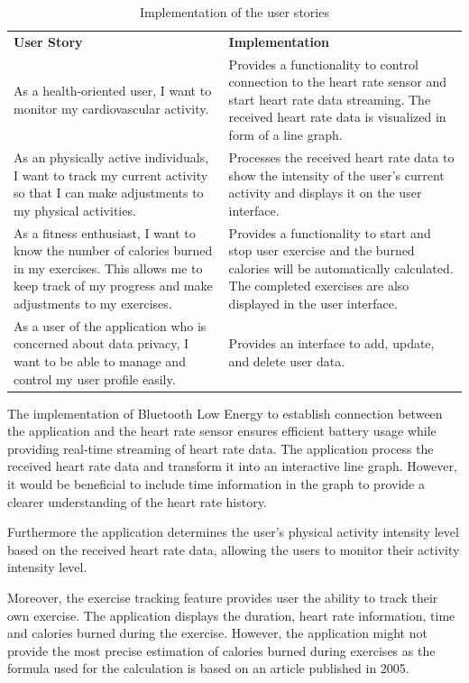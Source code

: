 \begin{longtable}{p{} p{}}
    \label{tab:user_story_and_assessment}\\

    \caption{Implementation of the user stories}\\
        \hline
        \textbf{User Story} & \textbf{Implementation} \\
        \hline
        As a health-oriented user, I want to monitor my cardiovascular activity. & Provides a functionality to control connection to the heart rate sensor and start heart rate data streaming. The received heart rate data is visualized in form of a line graph.\\
        \hline
        As an physically active individuals, I want to track my current activity so that I can make adjustments to my physical activities. & Processes the received heart rate data to show the intensity of the user's current activity and displays it on the user interface.\\    
        \hline
        As a fitness enthusiast, I want to know the number of calories burned in my exercises. This allows me to keep track of my progress and make adjustments to my exercises. & Provides a functionality to start and stop user exercise and the burned calories will be automatically calculated. The completed exercises are also displayed in the user interface.\\
        \hline
        As a user of the application who is concerned about data privacy, I want to be able to manage and control my user profile easily. & Provides an interface to add, update, and delete user data.\\
        \hline
\end{longtable}

The implementation of Bluetooth Low Energy to establish connection between the application and the heart rate sensor ensures efficient battery usage while providing real-time streaming of heart rate data. 
The application process the received heart rate data and transform it into an interactive line graph. 
However, it would be beneficial to include time information in the graph to provide a clearer understanding of the heart rate history.

Furthermore the application determines the user's physical activity intensity level based on the received heart rate data, allowing the users to monitor their activity intensity level.

Moreover, the exercise tracking feature provides user the ability to track their own exercise. The application displays the duration, heart rate information, time and calories burned during the exercise.
However, the application might not provide the most precise estimation of calories burned during exercises as the formula used for the calculation is based on an article published in 2005\autocite{keytel2005energy}.     

